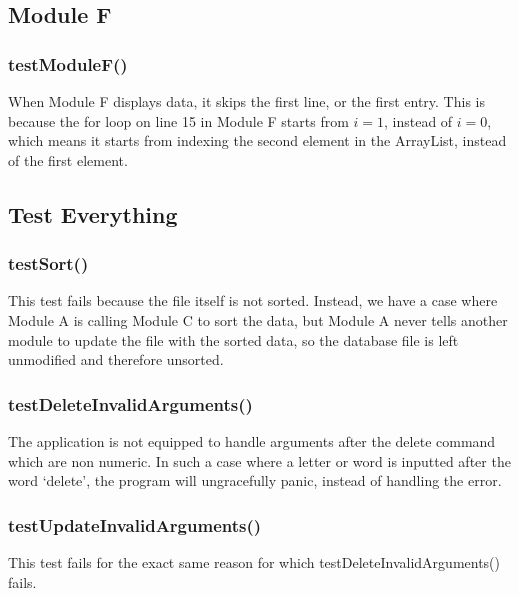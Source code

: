 \subsection{Module F}
\subsubsection{testModuleF()}
When Module F displays data, it skips the first line, or the first entry. This
is because the for loop on line 15 in Module F starts from $i=1$, instead of
$i=0$, which means it starts from indexing the second element in the ArrayList,
instead of the first element.


\subsection{Test Everything}
\subsubsection{testSort()}
This test fails because the file itself is not sorted. Instead, we have a case
where Module A is calling Module C to sort the data, but Module A never tells
another module to update the file with the sorted data, so the database file is
left unmodified and therefore unsorted.

\subsubsection{testDeleteInvalidArguments()}
The application is not equipped to handle arguments after the delete command
which are non numeric. In such a case where a letter or word is inputted after
the word `delete', the program will ungracefully panic, instead of handling the
error.

\subsubsection{testUpdateInvalidArguments()}
This test fails for the exact same reason for which
testDeleteInvalidArguments() fails.


